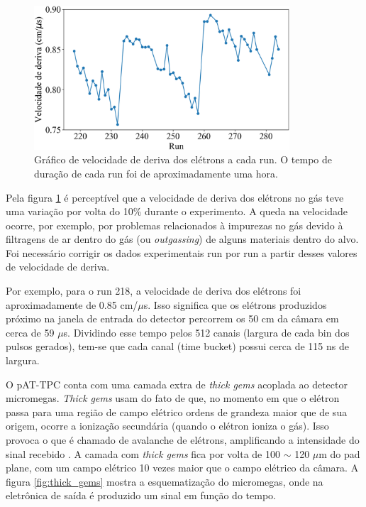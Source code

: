 \documentclass[a4paper,12pt,oneside]{book}
\begin{document}
\begin{figure}[H]
    \centering
    \includegraphics[width=0.85\textwidth]{figs/vdrift_vs_run.png}
    \caption{Gráfico de velocidade de deriva dos elétrons a cada run. O tempo de duração de cada run foi de aproximadamente uma hora.}
    \label{fig:vdrif_vs_run}
\end{figure}

\par Pela figura \ref{fig:vdrif_vs_run} é perceptível que a velocidade de deriva dos elétrons no gás teve uma variação por volta do 10\% durante o experimento. A queda na velocidade ocorre, por exemplo, por problemas relacionados à impurezas no gás devido à filtragens de ar dentro do gás (ou \textit{outgassing}) de alguns materiais dentro do alvo. Foi necessário corrigir os dados experimentais run por run a partir desses valores de velocidade de deriva.

\par Por exemplo, para o run 218, a velocidade de deriva dos elétrons foi aproximadamente de 0.85 cm/$\mu$s. Isso significa que os elétrons produzidos próximo na janela de entrada do detector percorrem os 50 cm da câmara em cerca de 59 $\mu$s. Dividindo esse tempo pelos 512 canais (largura de cada bin dos pulsos gerados), tem-se que cada canal (time bucket) possui cerca de 115 ns de largura.

\par O pAT-TPC conta com uma camada extra de \textit{thick gems} acoplada ao detector micromegas. \textit{Thick gems} usam do fato de que, no momento em que o elétron passa para uma região de campo elétrico ordens de grandeza maior que de sua origem, ocorre a ionização secundária (quando o elétron ioniza o gás). Isso provoca o que é chamado de avalanche de elétrons, amplificando a intensidade do sinal recebido \cite{GET}. A camada com \textit{thick gems} fica por volta de 100 $\sim$ 120 $\mu$m do pad plane, com um campo elétrico 10 vezes maior que o campo elétrico da câmara. A figura \ref{fig:thick_gems} mostra a esquematização do micromegas, onde na eletrônica de saída é produzido um sinal em função do tempo.
\end{document}
